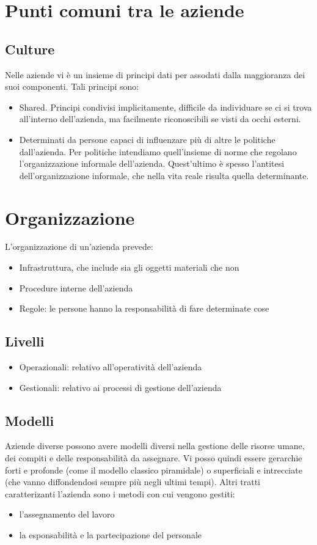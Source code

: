 \section{Punti comuni tra le aziende}
\subsection{Culture}
Nelle aziende vi \`e un insieme di principi dati per assodati dalla maggioranza dei suoi componenti. Tali principi sono:
\begin{itemize}
\item Shared. Principi condivisi implicitamente, difficile da individuare se ci si trova all'interno dell'azienda, ma facilmente riconoscibili se visti da occhi esterni.
\item Determinati da persone capaci di influenzare pi\`u di altre le politiche dall'azienda. Per politiche intendiamo quell'insieme di norme che regolano l'organizzazione informale dell'azienda.
Quest'ultimo \`e spesso l'antitesi dell'organizzazione informale, che nella vita reale risulta quella determinante.
\end{itemize}
\section{Organizzazione}
L'organizzazione di un'azienda prevede:
\begin{itemize}
	\item Infrastruttura, che include sia gli oggetti materiali che non
	\item Procedure interne dell'azienda
	\item Regole: le persone hanno la responsabilit\`a di fare determinate cose
\end{itemize}
\subsection{Livelli}
\begin{itemize}
	\item Operazionali: relativo all'operativit\`a dell'azienda
	\item Gestionali: relativo ai processi di gestione dell'azienda
\end{itemize}
\subsection{Modelli}
Aziende diverse possono avere modelli diversi nella gestione delle risorse umane, dei compiti e delle responsabilit\`a da assegnare. Vi posso quindi essere gerarchie forti e profonde (come il modello classico piramidale) o superficiali e intrecciate (che vanno diffondendosi sempre pi\`u negli ultimi tempi). Altri tratti caratterizanti l'azienda sono i metodi con cui vengono gestiti:
\begin{itemize}
	\item l'assegnamento del lavoro
	\item la esponsabilit\`a e la partecipazione del personale
\end{itemize}
